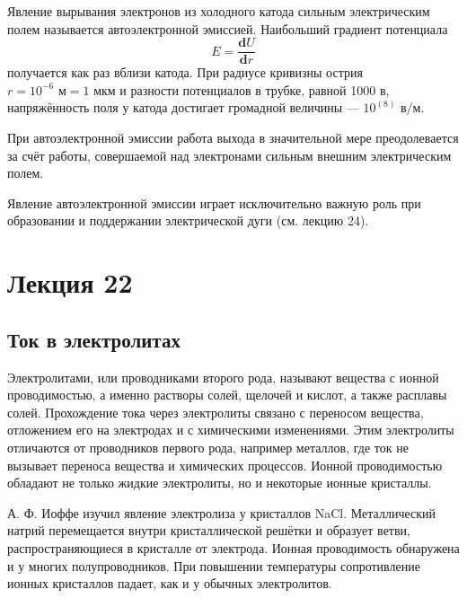 \documentclass[a4paper,10pt]{book}
\begin{document}
Явление вырывания электронов из холодного катода сильным электрическим полем называется автоэлектронной эмиссией. Наибольший градиент потенциала\begin{equation}
E = \frac{\mathbf{d}U}{\mathbf{d}r}
\end{equation} получается как раз вблизи катода. При радиусе кривизны острия $r=10^{-6} \textit{ м} = 1 \textit{ мкм} $ и разности потенциалов в трубке, равной 1000 $\textit{в}$, напряжённость поля у катода достигает громадной величины — $10^(8)\textit{ в/м} $.

При автоэлектронной эмиссии работа выхода в значительной мере преодолевается за счёт работы, совершаемой над электронами сильным внешним электрическим полем.

Явление автоэлектронной эмиссии играет исключительно важную роль при образовании и поддержании электрической дуги (см. лекцию 24).

\chapter{Лекция 22}
\section*{Ток в электролитах}

Электролитами, или проводниками второго рода, называют вещества с ионной проводимостью, а именно растворы солей, щелочей и кислот, а также расплавы солей. Прохождение тока через электролиты связано с переносом вещества, отложением его на электродах и с химическими изменениями. Этим электролиты отличаются от проводников первого рода, например металлов, где ток не вызывает переноса вещества и химических процессов. Ионной проводимостью обладают не только жидкие электролиты, но и некоторые ионные кристаллы.

А. Ф. Иоффе изучил явление электролиза у кристаллов NaCl. Металлический натрий перемещается внутри кристаллической решётки и образует ветви, распространяющиеся в кристалле от электрода. Ионная проводимость обнаружена и у многих полупроводников. При повышении температуры сопротивление ионных кристаллов падает, как и у обычных электролитов.
\end{document}
